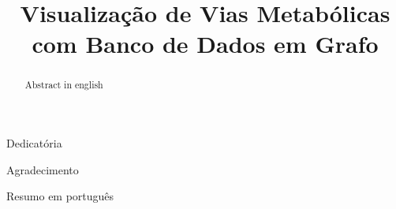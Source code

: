 \documentclass[bacharelado]{unb-cic}
\title{Visualização de Vias Metabólicas com Banco de Dados em Grafo}
\begin{document}
  \maketitle
  \pretextual

  \begin{dedicatoria}
  Dedicatória
  \end{dedicatoria}

  \begin{agradecimentos}
  Agradecimento
  \end{agradecimentos}

  \begin{resumo}
  Resumo em português
  \end{resumo}

  \begin{abstract}
  Abstract in english
  \end{abstract}

  \tableofcontents
  \listoffigures
  \listoftables

  \textual
  
  
  
  
  
  
  
  

  \postextual
  
  
\end{document}
